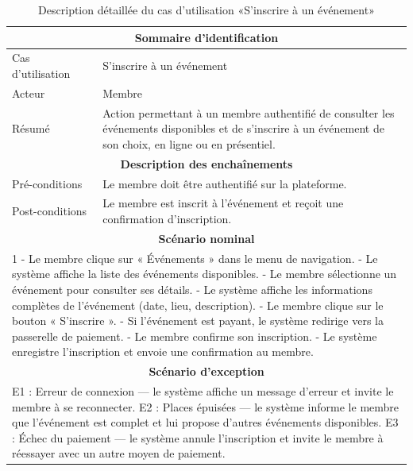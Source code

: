 \documentclass[12pt,a4paper]{report}
\begin{document}
	\begin{table}[H]
		\centering
		\renewcommand{\arraystretch}{1.4}
		\begin{tabular}{|p{3.5cm}|p{9.5cm}|}
			\hline
			\multicolumn{2}{|c|}{\textbf{Sommaire d'identification}} \\
			\hline
			Cas d'utilisation & S'inscrire à un événement \\
			\hline
			Acteur & Membre \\
			\hline
			Résumé & Action permettant à un membre authentifié de consulter les événements disponibles et de s'inscrire à un événement de son choix, en ligne ou en présentiel. \\
			\hline
			\multicolumn{2}{|c|}{\textbf{Description des enchaînements}} \\
			\hline
			Pré-conditions & Le membre doit être authentifié sur la plateforme. \\
			\hline
			Post-conditions & Le membre est inscrit à l'événement et reçoit une confirmation d'inscription. \\
			\hline
			\multicolumn{2}{|c|}{\textbf{Scénario nominal}} \\
			\hline
			\multicolumn{2}{|p{13cm}|}{%
				1 - Le membre clique sur « Événements » dans le menu de navigation.\newline
				2 - Le système affiche la liste des événements disponibles.\newline
				3 - Le membre sélectionne un événement pour consulter ses détails.\newline
				4 - Le système affiche les informations complètes de l'événement (date, lieu, description).\newline
				5 - Le membre clique sur le bouton « S'inscrire ».\newline
				6 - Si l'événement est payant, le système redirige vers la passerelle de paiement.\newline
				7 - Le membre confirme son inscription.\newline
				8 - Le système enregistre l'inscription et envoie une confirmation au membre.%
			} \\
			\hline
			\multicolumn{2}{|c|}{\textbf{Scénario d'exception}} \\
			\hline
			\multicolumn{2}{|p{13cm}|}{%
				E1 : Erreur de connexion — le système affiche un message d'erreur et invite le membre à se reconnecter.\newline
				E2 : Places épuisées — le système informe le membre que l'événement est complet et lui propose d'autres événements disponibles.\newline
				E3 : Échec du paiement — le système annule l'inscription et invite le membre à réessayer avec un autre moyen de paiement.%
			} \\
			\hline
		\end{tabular}
		\caption{Description détaillée du cas d'utilisation «S'inscrire à un événement»}
		\label{tab:uc-inscrire-evenement}
	\end{table}
\end{document}
